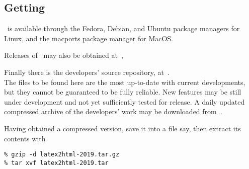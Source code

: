 \subsection[center]{Getting \protect\latextohtml}
\tableofchildlinks*
\htmlrule
\latextohtml\ is available through the Fedora, Debian, and Ubuntu
package managers for Linux, and the macports package manager for MacOS.

%
Releases of \latextohtml\ may also be obtained at
\,,

\bigskip
{}\label{cvsrepos}%
\noindent
Finally there is the \latextohtml{} developers' source repository, at \CVSrepos\,.\\
The files to be found here are the most up-to-date with current developments,
but they cannot be guaranteed to be fully reliable. New features may be
still under development and not yet sufficiently tested for release.
A daily updated compressed archive of the developers' work may be
downloaded from \CVSlatest\,.

\htmlrule{}%
\medskip\noindent
Having obtained a compressed  version, save it into a file 
 say,
then extract its contents with 
\begin{small}
\begin{verbatim}
% gzip -d latex2html-2019.tar.gz
% tar xvf latex2html-2019.tar
\end{verbatim} 
\end{small}
%

